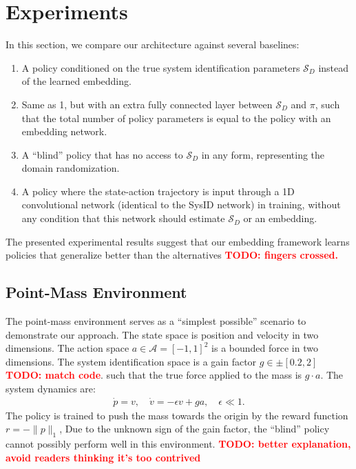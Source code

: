 \documentclass{article}
\newcommand{\TODO}[1]{\textcolor{red}{\textbf{TODO: #1}}}
\newcommand{\cA}{\mathcal{A}}
\newcommand{\cS}{\mathcal{S}}
\begin{document}
\section{Experiments}
In this section, we compare our architecture against several baselines:
\begin{enumerate}
\item A policy conditioned on the true system identification parameters $\cS_D$ instead of the learned embedding.
\item Same as 1, but with an extra fully connected layer between $\cS_D$ and $\pi$, such that the total number of policy parameters is equal to the policy with an embedding network.
\item A ``blind'' policy that has no access to $\cS_D$ in any form, representing the domain randomization.
\item A policy where the state-action trajectory is input through a 1D convolutional network (identical to the SysID network) in training, without any condition that this network should estimate $\cS_D$ or an embedding.
\end{enumerate}
The presented experimental results suggest that our embedding framework learns policies that generalize better than the alternatives \TODO{fingers crossed.}

\subsection{Point-Mass Environment}
The point-mass environment serves as a ``simplest possible'' scenario to demonstrate our approach.
The state space is position and velocity in two dimensions.
The action space $a \in \cA = [-1, 1]^2$ is a bounded force in two dimensions.
The system identification space is a gain factor $g \in \pm[0.2, 2]$ \TODO{match code}.
such that the true force applied to the mass is $g \cdot a$.
The system dynamics are:
\begin{equation}\begin{split}
\dot p = v, \quad \dot v = -\epsilon v + ga, \quad \epsilon \ll 1.
\end{split}\end{equation}
The policy is trained to push the mass towards the origin
by the reward function $r = -\|p\|_1$,
Due to the unknown sign of the gain factor, the ``blind'' policy cannot possibly perform well in this environment.
\TODO{better explanation, avoid readers thinking it's too contrived}
\end{document}
